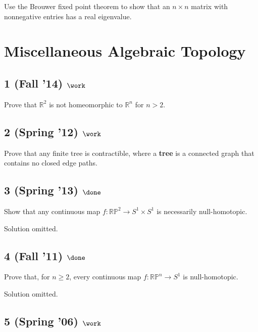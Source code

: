 Use the Brouwer fixed point theorem to show that an \(n \times n\)
matrix with nonnegative entries has a real eigenvalue.

\hypertarget{miscellaneous-algebraic-topology}{%
\section{Miscellaneous Algebraic
Topology}\label{miscellaneous-algebraic-topology}}

\hypertarget{fall-14-work-6}{%
\subsection{\texorpdfstring{1 (Fall '14)
\(\work\)}{1 (Fall '14) \textbackslash work}}\label{fall-14-work-6}}

Prove that \({\mathbb{R}}^2\) is not homeomorphic to \({\mathbb{R}}^n\)
for \(n > 2\).

\hypertarget{spring-12-work-4}{%
\subsection{\texorpdfstring{2 (Spring '12)
\(\work\)}{2 (Spring '12) \textbackslash work}}\label{spring-12-work-4}}

Prove that any finite tree is contractible, where a \textbf{tree} is a
connected graph that contains no closed edge paths.

\hypertarget{spring-13-done}{%
\subsection{\texorpdfstring{3 (Spring '13)
\(\done\)}{3 (Spring '13) \textbackslash done}}\label{spring-13-done}}

Show that any continuous map \(f : {\mathbb{RP}}^2 \to S^1 \times S^1\)
is necessarily null-homotopic.

Solution omitted.

\hypertarget{fall-11-done-1}{%
\subsection{\texorpdfstring{4 (Fall '11)
\(\done\)}{4 (Fall '11) \textbackslash done}}\label{fall-11-done-1}}

Prove that, for \(n \geq 2\), every continuous map
\(f: {\mathbb{RP}}^n \to S^1\) is null-homotopic.

Solution omitted.

\hypertarget{spring-06-work-6}{%
\subsection{\texorpdfstring{5 (Spring '06)
\(\work\)}{5 (Spring '06) \textbackslash work}}\label{spring-06-work-6}}

